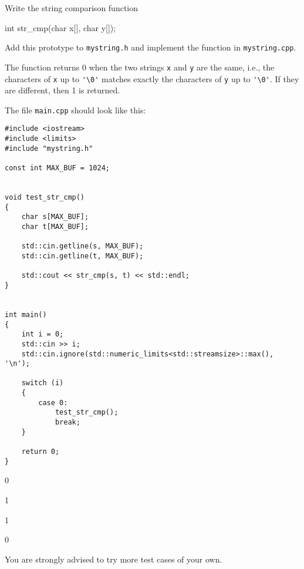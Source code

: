 Write the string comparison function
{\small
\begin{console}
int str_cmp(char x[], char y[]);
\end{console}
}
Add this prototype to \verb!mystring.h!
and implement the function in \verb!mystring.cpp!.

The function returns 0 when the two strings \verb!x! and \verb!y!
are the same, i.e., the characters of \verb!x! up to \verb!'\0'! 
matches exactly the characters of \verb!y! up to \verb!'\0'!.
If they are different, then 1 is returned.

The file \verb!main.cpp! should look like this:
{\small
\begin{Verbatim}[frame=single,commandchars=\~\!\@]
#include <iostream>
#include <limits>
#include "mystring.h"

const int MAX_BUF = 1024;


void test_str_cmp()
{
    char s[MAX_BUF];
    char t[MAX_BUF];
    
    std::cin.getline(s, MAX_BUF);
    std::cin.getline(t, MAX_BUF);
    
    std::cout << str_cmp(s, t) << std::endl;
}

  
int main()
{
    int i = 0;
    std::cin >> i;
    std::cin.ignore(std::numeric_limits<std::streamsize>::max(), '\n');

    switch (i)
    {
        case 0:
            test_str_cmp();
            break;
    }
    
    return 0;
}
\end{Verbatim}
}

\resett
\nextt
\begin{console}[fontsize=\small,commandchars=\\\{\}]
0
\end{console}

\nextt
\begin{console}[fontsize=\small,commandchars=\\\{\}]
1
\end{console}

\nextt
\begin{console}[fontsize=\small,commandchars=\\\{\}]
1
\end{console}

\nextt
\begin{console}[fontsize=\small,commandchars=\\\{\}]
0
\end{console}

You are strongly advised to try more test cases of your own.
